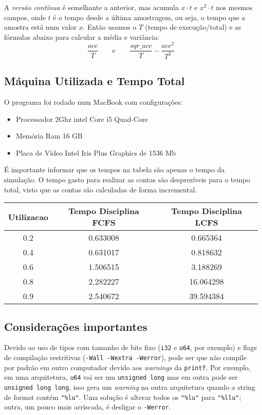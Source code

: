 \documentclass[a4paper]{article}
\newcommand{\inlcode}{\texttt}
\begin{document}
A \emph{versão contínua} é semelhante a anterior,
mas acumula \(x \cdot t\) e \(x^2 \cdot t\) nos mesmos campos,
onde \(t\) é
o tempo desde a última amostragem, ou seja,
o tempo que a amostra está num valor \(x\).
Então usamos o \(T\) (tempo de execução/total)
e as fórmulas abaixo para calcular a média e variância:
\[
    \frac{acc}{T}
    \qquad\text{e}\qquad
    \frac{sqr\_acc}{T} - \frac{acc^2}{T^2}
\]

\subsection{Máquina Utilizada e Tempo Total}
O programa foi rodado num MacBook com configurações:
\begin{itemize}
    \item Processador 2Ghz intel Core i5 Quad-Core
    \item Memória Ram 16 GB
    \item Placa de Vídeo Intel Iris Plus Graphics de 1536 Mb 
\end{itemize}


É importante informar que os tempos na tabela são apenas o tempo da simulação. O tempo gasto para realizar as contas são desprezíveis para o tempo total, visto que as contas são calculadas de forma incremental.


\begin{center} \begin{tabular}{|c|c|c|}
    \hline
     Utilizacao & Tempo Disciplina FCFS & Tempo Disciplina LCFS\\
    \hline
    0.2 & 0.633008 & 0.665364 \\
    \hline
    0.4 & 0.631017 & 0.818632 \\
    \hline
    0.6 & 1.506515 & 3.188269 \\
    \hline
    0.8 & 2.282227 & 16.064298 \\
    \hline
    0.9 & 2.540672 & 39.594384 \\
    \hline
\end{tabular} \end{center}


\subsection{Considerações importantes}

Devido ao uso de tipos com tamanho de bits fixo
(\inlcode{i32} e \inlcode{u64}, por exemplo)
e flags de compilação restritivas (\inlcode{-Wall -Wextra -Werror}),
pode ser que não compile por padrão em outro computador
devido aos \emph{warnings} da \inlcode{printf}.
Por exemplo, em uma arquitetura,
\inlcode{u64} vai ser um \inlcode{unsigned long}
mas em outra pode ser \inlcode{unsigned long long},
isso gera um \emph{warning} na outra arquitetura
quando a string de format contém \verb."%lu"..
Uma solução é alterar todos os
\verb."%lu". para \verb."%llu".;
outra, um pouco mais arriscada,
é desligar o \inlcode{-Werror}.
\end{document}
